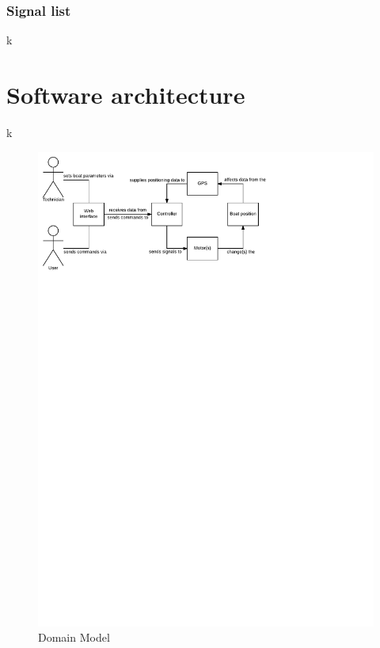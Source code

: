 \subsubsection{Signal list}
k

\section{Software architecture}
k

\begin{figure}[H]
	\centering
	\includegraphics[width=1.5\linewidth]{Images/Domain_Model}
	\caption{Domain Model}
	\label{fig:domainmodel}
\end{figure}

